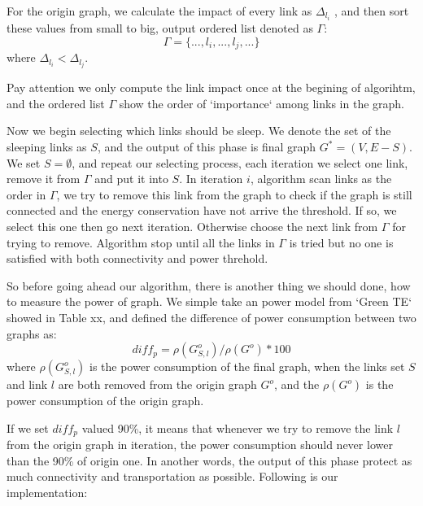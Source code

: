 \documentclass[conference]{IEEEtran}
\begin{document}
For the origin graph, we calculate the impact of every link as $\Delta_{l_i}$ , and then sort these values
from small to big, output ordered list denoted as $\Gamma$: 
\begin{equation}
	\Gamma = \{..., l_i, ..., l_j, ...\}
\end{equation}
where $\Delta_{l_i} < \Delta_{l_j}$.


Pay attention we only compute the link impact once at the begining of algorihtm, and the ordered list $\Gamma$ show 
the order of `importance` among links in the graph. 


Now we begin selecting which links should be sleep.
We denote the set of the sleeping links as $S$, and the output of this phase is final graph $G^* = (V, E-S)$. We set 
$S = \emptyset$, and repeat our selecting process, each iteration we select one link, remove it from $\Gamma$ and put it into $S$. 
In iteration $i$, algorithm scan links as the order in $\Gamma$, we try to
remove this link from the graph to check if the graph is still connected and the energy conservation have not arrive the threshold.
If so, we select this one then go next iteration.
Otherwise choose the next link from $\Gamma$ for trying to remove. Algorithm
stop until all the links in $\Gamma$ is tried but no one is satisfied with both connectivity and power threhold.


So before going ahead our algorithm, there is another thing we should done, how to measure the power of graph.
We simple take an power model from `Green TE` showed in Table xx, and defined the difference of power consumption 
between two graphs as:
\begin{equation}
	diff_p = \rho(G_{S, l}^o) / \rho(G^o) * 100
\end{equation}
where $\rho(G_{S, l}^o)$ is the power consumption of the final graph, when the links set $S$ and 
link $l$ are both removed from the origin graph $G^o$, and the $\rho(G^o)$ is the power consumption of 
the origin graph.


If we set $diff_p$ valued 90\%, it means that whenever we try to remove the link $l$ from the origin graph in 
iteration, the power consumption should never lower than the 90\% of origin one. In another words, the output 
of this phase protect as much connectivity and transportation as possible. Following is our implementation: 
\end{document}
